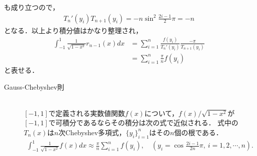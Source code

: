 \documentclass[a4j,papersize,disablejfam,slide,14pt]{jsarticle}
\def\sin#1#2{\operatorname{sin}^{#2} #1} %
\def\cos#1#2{\operatorname{cos}^{#2} #1} %
\begin{document}
    も成り立つので，
    \begin{align}
    	T_n'(y_i) T_{n+1}(y_i) = -n \sin{\frac{2i-1}{2}\pi}{2} = -n
    \end{align}
    となる．以上より積分値はかなり整理され，
    \begin{align}
    	\int_{-1}^{1} \frac{1}{\sqrt{1-x^2}} r_{n-1}(x) dx &= \sum_{i=1}^{n} \frac{f(y_i)}{T_n'(y_i)} \frac{-\pi}{T_{n+1}(y_i)} \\
        &= \sum_{i=1}^{n} \frac{\pi}{n} f(y_i)
    \end{align}
    と表せる．
    
    \begin{screen}
    	\begin{description}
        	\item[{\rm Gauss-Chebyshev}則]\mbox{}\\
            $[-1,1]$で定義される実数値関数$f(x)$について，$f(x)/\sqrt{1-x^2}$が$[-1,1]$で可積分であるならその積分は次の式で近似される．
            式中の$T_n(x)$は$n$次{\rm Chebyshev}多項式，$\{y_i\}_{i=1}^{n}$はその$n$個の根である．
            \begin{align}
            	\int_{-1}^{1} \frac{1}{\sqrt{1-x^2}} f(x) dx \approx \frac{\pi}{n} \sum_{i=1}^{n} f(y_i), \quad (y_i = \cos{\frac{2i-1}{2n}\pi}{},\ i=1,2,\cdots, n).
            \end{align}
        \end{description}
    \end{screen}
\end{document}

